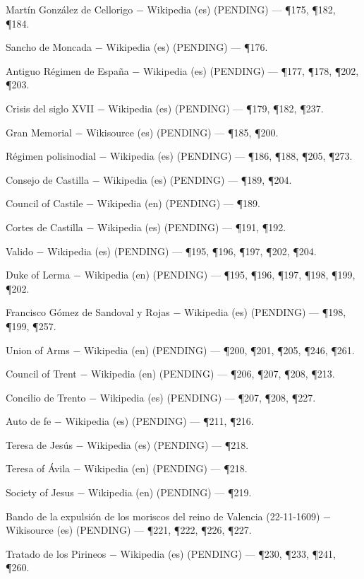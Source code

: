 \documentclass{book}
\begin{document}
\noindent Martín González de Cellorigo \(-\) Wikipedia (es) (PENDING) --- \P175, \P182, \P184.

\noindent Sancho de Moncada \(-\) Wikipedia (es) (PENDING) --- \P176.

\noindent Antiguo Régimen de España \(-\) Wikipedia (es) (PENDING) --- \P177, \P178, \P202, \P203.

\noindent Crisis del siglo XVII \(-\) Wikipedia (es) (PENDING) --- \P179, \P182, \P237.

\noindent Gran Memorial \(-\) Wikisource (es) (PENDING) --- \P185, \P200.

\noindent Régimen polisinodial \(-\) Wikipedia (es) (PENDING) --- \P186, \P188, \P205, \P273.

\noindent Consejo de Castilla \(-\) Wikipedia (es) (PENDING) --- \P189, \P204.

\noindent Council of Castile \(-\) Wikipedia (en) (PENDING) --- \P189.

\noindent Cortes de Castilla \(-\) Wikipedia (es) (PENDING) --- \P191, \P192.

\noindent Valido \(-\) Wikipedia (es) (PENDING) --- \P195, \P196, \P197, \P202, \P204.

\noindent Duke of Lerma \(-\) Wikipedia (en) (PENDING) --- \P195, \P196, \P197, \P198, \P199, \P202.

\noindent Francisco Gómez de Sandoval y Rojas \(-\) Wikipedia (es) (PENDING) --- \P198, \P199, \P257.

\noindent Union of Arms \(-\) Wikipedia (en) (PENDING) --- \P200, \P201, \P205, \P246, \P261.

\noindent Council of Trent \(-\) Wikipedia (en) (PENDING) --- \P206, \P207, \P208, \P213.

\noindent Concilio de Trento \(-\) Wikipedia (es) (PENDING) --- \P207, \P208, \P227.

\noindent Auto de fe \(-\) Wikipedia (es) (PENDING) --- \P211, \P216.

\noindent Teresa de Jesús \(-\) Wikipedia (es) (PENDING) --- \P218.

\noindent Teresa of Ávila \(-\) Wikipedia (en) (PENDING) --- \P218.

\noindent Society of Jesus \(-\) Wikipedia (en) (PENDING) --- \P219.

\noindent Bando de la expulsión de los moriscos del reino de Valencia (22-11-1609) \(-\) Wikisource (es) (PENDING) --- \P221, \P222, \P226, \P227.

\noindent Tratado de los Pirineos \(-\) Wikipedia (es) (PENDING) --- \P230, \P233, \P241, \P260.
\end{document}

